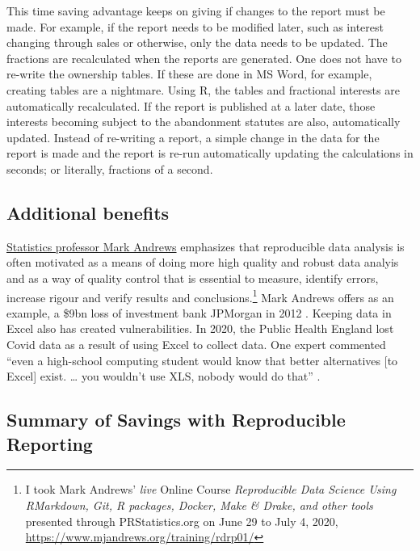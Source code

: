 \documentclass[
]{book}
\begin{document}
This time saving advantage keeps on giving if changes to the report must be made. For example, if the report needs to be modified later, such as interest changing through sales or otherwise, only the data needs to be updated. The fractions are recalculated when the reports are generated. One does not have to re-write the ownership tables. If these are done in MS Word, for example, creating tables are a nightmare. Using R, the tables and fractional interests are automatically recalculated. If the report is published at a later date, those interests becoming subject to the abandonment statutes are also, automatically updated. Instead of re-writing a report, a simple change in the data for the report is made and the report is re-run automatically updating the calculations in seconds; or literally, fractions of a second.

\hypertarget{additional-benefits}{%
\subsection{Additional benefits}\label{additional-benefits}}

\href{https://us.sagepub.com/en-us/nam/author/mark-andrews}{Statistics professor Mark Andrews} \citep{andrewsChapterReproducibleData} emphasizes that reproducible data analysis is often motivated as a means of doing more high quality and robust data analyis and as a way of quality control that is essential to measure, identify errors, increase rigour and verify results and conclusions.\footnote{I took Mark Andrews' \emph{live} Online Course \emph{Reproducible Data Science Using RMarkdown, Git, R packages, Docker, Make \& Drake, and other tools} presented through PRStatistics.org on June 29 to July 4, 2020, \url{https://www.mjandrews.org/training/rdrp01/}} Mark Andrews offers as an example, a \$9bn loss of investment bank JPMorgan in 2012 \citep{ExcelMostDangerous2021}. Keeping data in Excel also has created vulnerabilities. In 2020, the Public Health England lost Covid data as a result of using Excel to collect data. One expert commented ``even a high-school computing student would know that better alternatives {[}to Excel{]} exist. \ldots{} you wouldn't use XLS, nobody would do that'' \citep{ExcelWhyUsing2020}.

\hypertarget{summary-of-savings-with-reproducible-reporting}{%
\subsection{Summary of Savings with Reproducible Reporting}\label{summary-of-savings-with-reproducible-reporting}}
\end{document}

